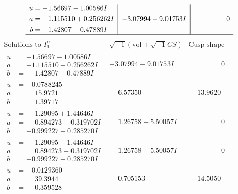 \documentclass[1p]{elsarticle_modified}
\theoremstyle{definition}
\newcommand{\I}{\sqrt{-1}}
\begin{document}
$$\begin{array}{c|c|c}
\begin{aligned}
u &= -1.56697 + 1.00586 I \\
a &= -1.115510 + 0.256262 I \\
b &= \phantom{-}1.42807 + 0.47889 I\end{aligned}
 & -3.07994 + 9.01753 I & \phantom{-0.000000 } 0\\
 \hline 
 \end{array}$$\newpage$$\begin{array}{c|c|c}  
\text{Solutions to }I^u_{1}& \I (\text{vol} + \sqrt{-1}CS) & \text{Cusp shape}\\
 \hline 
\begin{aligned}
u &= -1.56697 - 1.00586 I \\
a &= -1.115510 - 0.256262 I \\
b &= \phantom{-}1.42807 - 0.47889 I\end{aligned}
 & -3.07994 - 9.01753 I & \phantom{-0.000000 } 0 \\ \hline\begin{aligned}
u &= -0.0788245\phantom{ +0.000000I} \\
a &= \phantom{-}15.9721\phantom{ +0.000000I} \\
b &= \phantom{-}1.39717\phantom{ +0.000000I}\end{aligned}
 & \phantom{-}6.57350\phantom{ +0.000000I} & \phantom{-}13.9620\phantom{ +0.000000I} \\ \hline\begin{aligned}
u &= \phantom{-}1.29095 + 1.44646 I \\
a &= \phantom{-}0.894273 + 0.319702 I \\
b &= -0.999227 + 0.285270 I\end{aligned}
 & \phantom{-}1.26758 - 5.50057 I & \phantom{-0.000000 } 0 \\ \hline\begin{aligned}
u &= \phantom{-}1.29095 - 1.44646 I \\
a &= \phantom{-}0.894273 - 0.319702 I \\
b &= -0.999227 - 0.285270 I\end{aligned}
 & \phantom{-}1.26758 + 5.50057 I & \phantom{-0.000000 } 0 \\ \hline\begin{aligned}
u &= -0.0129360\phantom{ +0.000000I} \\
a &= \phantom{-}39.3944\phantom{ +0.000000I} \\
b &= \phantom{-}0.359528\phantom{ +0.000000I}\end{aligned}
 & \phantom{-}0.705153\phantom{ +0.000000I} & \phantom{-}14.5050\phantom{ +0.000000I} \\ \hline\begin{aligned}

\end{aligned}
\end{array}$$
\end{document}
